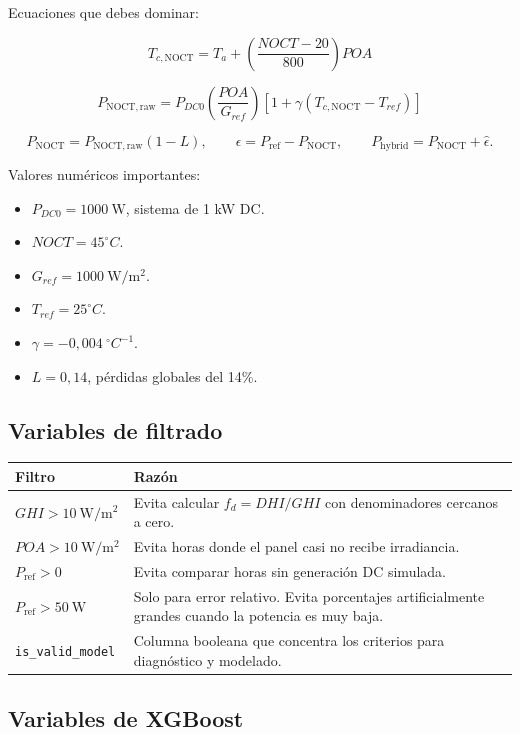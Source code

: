 \documentclass[11pt, letterpaper]{article}
\newcommand{\fd}{f_d}
\newcommand{\pnoct}{P_{\mathrm{NOCT}}}
\newcommand{\pref}{P_{\mathrm{ref}}}
\newcommand{\phybrid}{P_{\mathrm{hybrid}}}
\begin{document}
Ecuaciones que debes dominar:

\[
    T_{c,\mathrm{NOCT}} = T_a + \left(\frac{NOCT-20}{800}\right)POA
\]

\[
    P_{\mathrm{NOCT,raw}} =
    P_{DC0}
    \left(\frac{POA}{G_{ref}}\right)
    \left[1+\gamma(T_{c,\mathrm{NOCT}}-T_{ref})\right]
\]

\[
    \pnoct = P_{\mathrm{NOCT,raw}}(1-L),
    \qquad
    \epsilon = \pref-\pnoct,
    \qquad
    \phybrid = \pnoct+\widehat{\epsilon}.
\]

Valores num\'ericos importantes:

\begin{itemize}
    \item \(P_{DC0} = 1000\ \mathrm{W}\), sistema de 1 kW DC.
    \item \(NOCT = 45^\circ C\).
    \item \(G_{ref} = 1000\ \mathrm{W/m^2}\).
    \item \(T_{ref} = 25^\circ C\).
    \item \(\gamma = -0{,}004\ ^\circ C^{-1}\).
    \item \(L = 0{,}14\), p\'erdidas globales del 14\%.
\end{itemize}

\subsection{Variables de filtrado}

\begin{longtable}{p{4.0cm}p{9.5cm}}
\toprule
\textbf{Filtro} & \textbf{Raz\'on} \\
\midrule
\endhead
\(GHI > 10\ \mathrm{W/m^2}\) & Evita calcular \(\fd = DHI/GHI\) con denominadores cercanos a cero. \\
\(POA > 10\ \mathrm{W/m^2}\) & Evita horas donde el panel casi no recibe irradiancia. \\
\(\pref > 0\) & Evita comparar horas sin generaci\'on DC simulada. \\
\(\pref > 50\ \mathrm{W}\) & Solo para error relativo. Evita porcentajes artificialmente grandes cuando la potencia es muy baja. \\
\texttt{is\_valid\_model} & Columna booleana que concentra los criterios para diagn\'ostico y modelado. \\
\bottomrule
\end{longtable}

\subsection{Variables de XGBoost}
\end{document}
